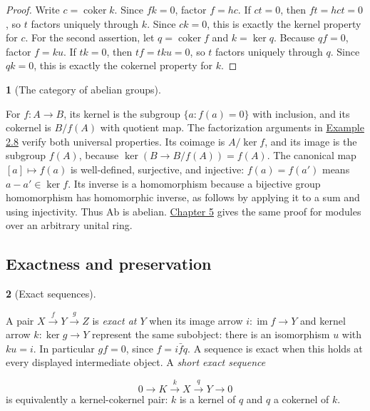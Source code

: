 \documentclass[11pt,a4paper]{article}
\newcommand{\mathheading}{}
\theoremstyle{plain}
\theoremstyle{definition}
\newtheorem*{definitionstatement}{\mathheading}
\newenvironment{mathdefinition}[3]{\renewcommand{\mathheading}{#1 #2}\begin{definitionstatement}[#3]}{\end{definitionstatement}}
\begin{document}
\begin{proof}

Write \(c=\operatorname{coker}k\). Since \(fk=0\), factor \(f=hc\). If \(ct=0\), then \(ft=hct=0\), so \(t\) factors uniquely through \(k\). Since \(ck=0\), this is exactly the kernel property for \(c\). For the second assertion, let \(q=\operatorname{coker}f\) and \(k=\ker q\). Because \(qf=0\), factor \(f=ku\). If \(tk=0\), then \(tf=tku=0\), so \(t\) factors uniquely through \(q\). Since \(qk=0\), this is exactly the cokernel property for \(k\).


\end{proof}
 
\begin{mathdefinition}{Example}{4.7}{The category of abelian groups}
\label{env-4-7}

For \(f:A\to B\), its kernel is the subgroup \(\{a:f(a)=0\}\) with inclusion, and its cokernel is \(B/f(A)\) with quotient map. The factorization arguments in \hyperref[env-2-8]{Example 2.8} verify both universal properties. Its coimage is \(A/\ker f\), and its image is the subgroup \(f(A)\), because \(\ker(B\to B/f(A))=f(A)\). The canonical map \([a]\mapsto f(a)\) is well-defined, surjective, and injective: \(f(a)=f(a')\) means \(a-a'\in\ker f\). Its inverse is a homomorphism because a bijective group homomorphism has homomorphic inverse, as follows by applying it to a sum and using injectivity. Thus \(\mathrm{Ab}\) is abelian. \hyperref[chapter-05]{Chapter 5} gives the same proof for modules over an arbitrary unital ring.


\par{}\par

\end{mathdefinition}
 
\subsection{Exactness and preservation}

\begin{mathdefinition}{Definition}{4.8}{Exact sequences}
\label{env-4-8}

A pair \(X\xrightarrow{f}Y\xrightarrow{g}Z\) is \emph{exact at \(Y\)} when its image arrow \(i:\operatorname{im}f\to Y\) and kernel arrow \(k:\ker g\to Y\) represent the same subobject: there is an isomorphism \(u\) with \(ku=i\). In particular \(gf=0\), since \(f=i\bar f q\). A sequence is exact when this holds at every displayed intermediate object. A \emph{short exact sequence}

\[0\longrightarrow K\xrightarrow{k}X\xrightarrow{q}Y\longrightarrow0\] 
is equivalently a kernel-cokernel pair: \(k\) is a kernel of \(q\) and \(q\) a cokernel of \(k\).


\par{}\par

\end{mathdefinition}
 
\end{document}
